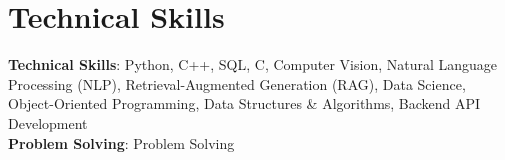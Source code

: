 \documentclass[letterpaper,11pt]{article}
\begin{document}
\section{Technical Skills}
 \begin{itemize}[leftmargin=0.15in, label={}]
    \small{\item{
           \textbf{Technical Skills}{: Python, C++, SQL, C, Computer Vision, Natural Language Processing (NLP), Retrieval-Augmented Generation (RAG), Data Science, Object-Oriented Programming, Data Structures \& Algorithms, Backend API Development} \\
           \textbf{Problem Solving}{: Problem Solving} \\
         }}
 \end{itemize}
\end{document}
